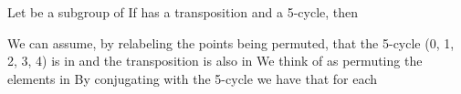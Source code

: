 \documentclass[11pt,oneside]{article}
\begin{document}
\begin{BookBody}
 Let  be a subgroup of  If  has a transposition and a 5-cycle, then 

 We can assume, by relabeling the points being permuted, that the 5-cycle (0, 1, 2, 3, 4) is in  and the transposition  is also in  We think of  as permuting the 
elements in  By conjugating with the 5-cycle  we have that for each 

\end{BookBody}

\BookNarrativetrue
\end{document}
